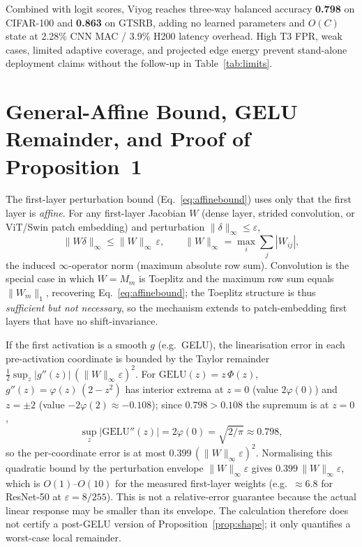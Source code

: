\documentclass[10pt,letterpaper,journal]{IEEEtran}
\newcommand{\rev}[1]{#1}
\begin{document}
\rev{Combined with logit scores, Viyog reaches three-way balanced accuracy
\textbf{0.798} on CIFAR-100 and \textbf{0.863} on GTSRB, adding no learned
parameters and $O(C)$ state at 2.28\% CNN MAC / 3.9\% H200 latency overhead.
High T3 FPR, weak cases, limited adaptive coverage, and projected edge energy
prevent stand-alone deployment claims without the follow-up in
Table~\ref{tab:limits}.}

\appendices
\section{General-Affine Bound, GELU Remainder, and Proof of Proposition~1}
\label{app:affine}
The first-layer perturbation bound (Eq.~\eqref{eq:affinebound}) uses only that the first layer is
\emph{affine}. For any first-layer Jacobian $W$ (dense layer, strided
convolution, or ViT/Swin patch embedding) and perturbation $\|\delta\|_\infty
\le\varepsilon$,
\begin{equation}
  \|W\delta\|_\infty \le \|W\|_\infty\,\varepsilon,\qquad
  \|W\|_\infty=\max_i\textstyle\sum_j|W_{ij}|,
  \label{eq:affinebound}
\end{equation}
the induced $\infty$-operator norm (maximum absolute row sum). Convolution is
the special case in which $W=M_m$ is Toeplitz and the maximum row sum equals
$\|W_m\|_1$, recovering Eq.~\eqref{eq:affinebound}; the Toeplitz structure is thus
\emph{sufficient but not necessary}, so the mechanism extends to patch-embedding
first layers that have no shift-invariance.

If the first activation is a smooth $g$ (e.g.\ GELU), the linearisation error
in each pre-activation coordinate is bounded by the Taylor remainder
$\tfrac12\sup_z|g''(z)|\,(\|W\|_\infty\varepsilon)^2$. For
$\mathrm{GELU}(z)=z\,\Phi(z)$, $g''(z)=\varphi(z)\,(2-z^2)$ has interior extrema
at $z=0$ (value $2\varphi(0)$) and $z=\pm2$ (value $-2\varphi(2)\approx-0.108$);
since $0.798>0.108$ the supremum is at $z=0$,
\begin{equation}
  \sup_z|\mathrm{GELU}''(z)| = 2\varphi(0) = \sqrt{2/\pi} \approx 0.798,
\end{equation}
so the per-coordinate error is at most $0.399\,(\|W\|_\infty\varepsilon)^2$.
Normalising this quadratic bound by the perturbation envelope
$\|W\|_\infty\varepsilon$ gives
$0.399\,\|W\|_\infty\varepsilon$, which is $O(1)$--$O(10)$ for the measured
first-layer weights (e.g.\ ${\approx}6.8$ for ResNet-50 at
$\varepsilon{=}8/255$). This is not a relative-error guarantee because the
actual linear response may be smaller than its envelope. The calculation
therefore does not certify a post-GELU version of
Proposition~\ref{prop:shape}; it only quantifies a worst-case local remainder.
\end{document}

